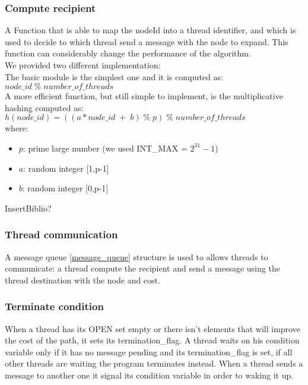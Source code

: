 \subsubsection{Compute recipient}
\label{compute_reci}

A Function that is able to map the nodeId into a thread identifier, and which is used to decide to which thread send a message with the node to expand.
This function can considerably change the performance of the algorithm.
\\ We provided two different implementation:
\\
The basic module is the simplest one and it is computed as: \\
$node\_id \; \% \;  number\_of\_threads$
\\
A more efficient function, but still simple to implement, is the multiplicative hashing computed as: \\
$ h(node\_id) =((a*node\_id \; + \; b) \; \% \; p) \; \% \; number\_of\_threads $  
\\ where:
\begin{itemize}
    \item $p$: prime large number (we used INT\_MAX =  $ 2^{31}-1 $)
    \item $a$: random integer [1,p-1]
    \item $b$: random integer [0,p-1]
\end{itemize}

InsertBiblio?

\subsubsection{Thread communication}
\label{thread_buf}

A message queue \ref{message_queue} structure is used to allows threads to communicate: a thread compute the recipient and send a message using the thread destination with the node and cost. 

\subsubsection{Terminate condition}
\label{terminate}

When a thread has its OPEN set empty or there isn't elements that will improve the cost of the path, it sets its termination\_flag.
A thread waits on his condition variable only if it has no message pending and its termination\_flag is set, if all other threads are waiting the program terminates instead.
When a thread sends a message to another one it signal its condition variable in order to waking it up. 

